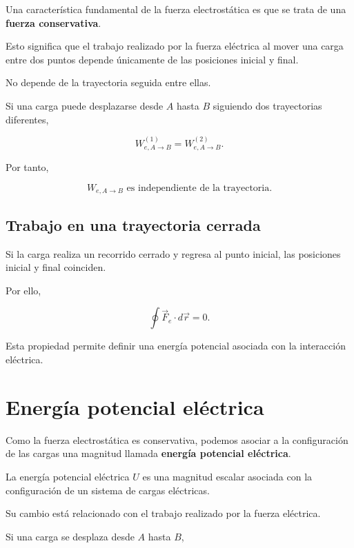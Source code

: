 Una característica fundamental de la fuerza electrostática es que se trata de una
\textbf{fuerza conservativa}.

Esto significa que el trabajo realizado por la fuerza eléctrica al mover una carga
entre dos puntos depende únicamente de las posiciones inicial y final.

No depende de la trayectoria seguida entre ellas.

Si una carga puede desplazarse desde \(A\) hasta \(B\) siguiendo dos trayectorias
diferentes,

\[
W_{e,A\to B}^{(1)}
=
W_{e,A\to B}^{(2)}.
\]

Por tanto,

\[
\boxed{
W_{e,A\to B}
\text{ es independiente de la trayectoria}
}.
\]


\subsection{Trabajo en una trayectoria cerrada}

Si la carga realiza un recorrido cerrado y regresa al punto inicial, las posiciones
inicial y final coinciden.

Por ello,

\begin{equation}
\boxed{
\oint \vec F_e\cdot d\vec r=0
}.
\label{eq:trabajo_cerrado_electrico}
\end{equation}

Esta propiedad permite definir una energía potencial asociada con la interacción
eléctrica.


\section{Energía potencial eléctrica}

Como la fuerza electrostática es conservativa, podemos asociar a la configuración
de las cargas una magnitud llamada \textbf{energía potencial eléctrica}.

\begin{definicion}

La energía potencial eléctrica \(U\) es una magnitud escalar asociada con la
configuración de un sistema de cargas eléctricas.

Su cambio está relacionado con el trabajo realizado por la fuerza eléctrica.

\end{definicion}

Si una carga se desplaza desde \(A\) hasta \(B\),

